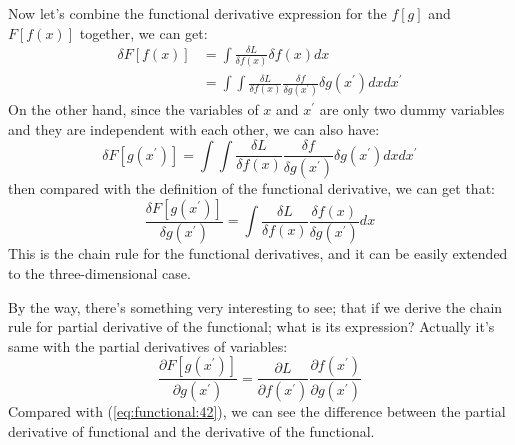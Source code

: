 Now let's combine the functional derivative expression for the $f[g]$
and $F[f(x)]$ together, we can get:
\begin{equation}
\begin{split}
\delta F[ f(x)] &= \int \frac{\delta L}{\delta f(x)} \delta f(x) dx
\\ 
&= \int \int \frac{\delta L}{\delta f(x)} \frac{\delta f}{\delta
g(x^{'})} \delta g(x^{'}) dx dx^{'}
\end{split}
\end{equation}
On the other hand, since the variables of $x$ and $x^{'}$ are
only two dummy variables and they are independent with each other, we
can also have:
\begin{equation}
\delta F[ g(x^{'})] = \int \int \frac{\delta L}{\delta f(x)}
\frac{\delta f}{\delta
g(x^{'})} \delta g(x^{'}) dx dx^{'}
\end{equation}
then compared with the definition of the functional derivative, we
can get that:
\begin{equation}
 \label{eq:functional:42}
\frac{\delta F[ g(x^{'})]}{\delta g(x^{'})} = \int \frac{\delta
L}{\delta
f(x)}
\frac{\delta f(x)}{\delta
g(x^{'})} dx
\end{equation} 
This is the chain rule for the functional derivatives, and it can be
easily extended to the three-dimensional case.

By the way, there's something very interesting to see; that if we
derive the chain rule for partial derivative of the functional; what
is its expression? Actually it's same with the partial derivatives of
variables:
\begin{equation}
\label{partial_derivative_functional}
\frac{\partial F[ g(x^{'})]}{\partial g(x^{'})} = \frac{\partial
L}{\partial f(x^{'})}\frac{\partial f(x^{'})}{\partial
g(x^{'})}
\end{equation} 
Compared with (\ref{eq:functional:42}), we can see the difference
between the partial derivative of functional and the derivative of
the functional.


